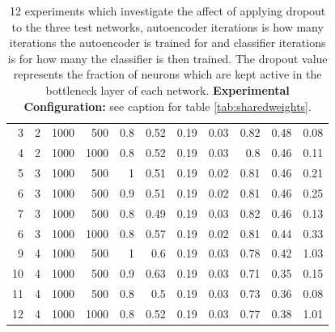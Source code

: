 \begin{table}[h]
{\begin{tabular}{rllrrrrrrrr}
      3                    & 2       & 1000             & 500       & 0.8      & 0.52     & 0.19      & 0.03      & 0.82                 & 0.48                 & 0.08                 \\
      4                    & 2       & 1000             & 1000       & 0.8      & 0.52     & 0.19      & 0.03      & 0.8                  & 0.46                 & 0.11                 \\
      \hline
      5                    & 3       & 1000             & 500       & 1        & 0.51     & 0.19      & 0.02      & 0.81                 & 0.46                 & 0.21                 \\
      6                    & 3       & 1000             & 500       & 0.9      & 0.51     & 0.19      & 0.02      & 0.81                 & 0.46                 & 0.25                 \\
      7                    & 3       & 1000             & 500       & 0.8      & 0.49     & 0.19      & 0.03      & 0.82                 & 0.46                 & 0.13                 \\
      6                    & 3       & 1000             & 1000       & 0.8      & 0.57     & 0.19      & 0.02      & 0.81                 & 0.44                 & 0.33                 \\
      \hline
      9                    & 4       & 1000             & 500       & 1        & 0.6      & 0.19      & 0.03      & 0.78                 & 0.42                 & 1.03                 \\
      10                   & 4       & 1000             & 500       & 0.9      & 0.63     & 0.19      & 0.03      & 0.71                 & 0.35                 & 0.15                 \\
      11                   & 4       & 1000             & 500       & 0.8      & 0.5      & 0.19      & 0.03      & 0.73                 & 0.36                 & 0.08\\
      12                   & 4       & 1000             & 1000       & 0.8      & 0.52      & 0.19      & 0.03      & 0.77   & 0.38     & 1.01\\
      \hline
      \end{tabular}
      }
      \caption{12 experiments which investigate the affect of applying dropout to the
      three test networks, autoencoder iterations is how many iterations
      the autoencoder is trained for and classifier iterations is for how many the
      classifier is then trained. The dropout value represents the
      fraction of neurons which are kept active in the bottleneck layer of each network.
      {\bf Experimental Configuration:} see caption for table \ref{tab:sharedweights}.}
      \label{tab:dropout}
      \end{table}


